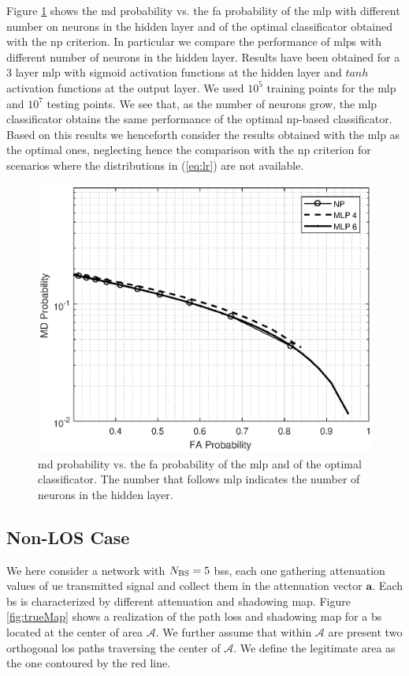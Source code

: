 \documentclass[twocolumns]{IEEEtran}
\begin{document}
Figure \ref{fig:NP_comp} shows the \ac{md} probability vs. the \ac{fa} probability of the \ac{mlp} with different number on neurons in the hidden layer and of the optimal classificator obtained with the  \ac{np} criterion. In particular we compare the performance of \acp{mlp} with different number of neurons in the hidden layer. Results have been obtained for a $3$ layer \ac{mlp} with sigmoid activation functions at the hidden layer and $tanh$ activation functions at the output layer. We used $10^5$ training points for the \ac{mlp} and $10^7$ testing points. We see that, as the number of neurons grow, the \ac{mlp} classificator obtains the same performance of the optimal \ac{np}-based classificator. Based on this results we henceforth consider the results obtained with the \ac{mlp} as the optimal ones, neglecting hence the comparison with the \ac{np} criterion for scenarios where the distributions in (\ref{eq:lr}) are not available.

 \begin{figure}[h]
     \centering
     \includegraphics[width=1\columnwidth]{FA_MD_LOS.eps}
     \caption{\ac{md} probability vs. the \ac{fa} probability of the \ac{mlp} and of the optimal classificator. The number that follows \ac{mlp} indicates the number of neurons in the hidden layer.}
     \label{fig:NP_comp}
 \end{figure}


\subsection{Non-LOS Case}
We here consider a network with $N_{\rm BS}=5$ \acp{bs}, each one gathering attenuation values of \ac{ue} transmitted signal and collect them in the attenuation vector $\bm{a}$. Each \ac{bs} is characterized by different attenuation and shadowing map. Figure \ref{fig:trueMap} shows a realization of the path loss and shadowing map for a \ac{bs} located at the center of area $\mathcal{A}$. We further assume that within $\mathcal{A}$ are present two orthogonal \ac{los} paths traversing the center of $\mathcal{A}$. We define the legitimate area as the one contoured by the red line.
\end{document}
